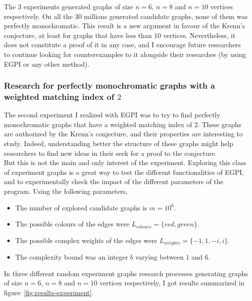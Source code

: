 The $3$ experiments generated graphs of size $n=6$, $n=8$ and $n=10$ vertices respectively.
On all the $30$ millions generated candidate graphs, none of them was perfectly monochromatic.
This result is a new argument in favour of the Krenn's conjecture, at least for graphs that have less than $10$ vertices.
Nevertheless, it does not constitute a proof of it in any case, and I encourage future researchers to continue looking for counterexamples to it alongside their researches (by using EGPI or any other method). \\


\subsubsection{Research for perfectly monochromatic graphs with a weighted matching index of $2$}

The second experiment I realized with EGPI was to try to find perfectly monochromatic graphs that have a weighted matching index of $2$.
These graphs are authorized by the Krenn's conjecture, and their properties are interesting to study.
Indeed, understanding better the structure of these graphs might help researchers to find new ideas in their seek for a proof to the conjecture.\\

But this is not the main and only interest of the experiment.
Exploring this class of experiment graphs is a great way to test the different functionalities of EGPI, and to experimentally check the impact of the different parameters of the program.
Using the following parameters,

\begin{itemize}
    \item The number of explored candidate graphs is $m = 10^6$.
    \item The possible colours of the edges were $L_{colours} = \{red, green\}$.
    \item The possible complex weights of the edges were $L_{weights} = \{-1, 1, -i, i\}$.
    \item The complexity bound was an integer $b$ varying between $1$ and $6$.
\end{itemize}

In three different random experiment graphs research processes generating graphs of size $n=6$, $n=8$ and $n=10$ vertices respectively, I got results summarized in figure~\ref{fig:results-experiment}.

